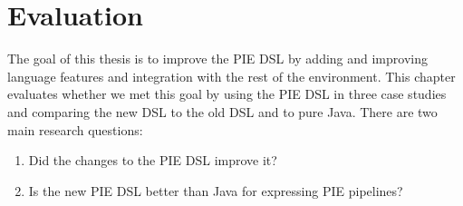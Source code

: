 \chapter{Evaluation}
\label{chap:evaluation}

The goal of this thesis is to improve the \ac{PIE} \ac{DSL} by adding and improving language features and integration with the rest of the environment.
This chapter evaluates whether we met this goal by using the \ac{PIE} \ac{DSL} in three case studies and comparing the new \ac{DSL} to the old \ac{DSL} and to pure Java.
There are two main research questions:
\begin{enumerate}
  \item Did the changes to the \ac{PIE} \ac{DSL} improve it?
  \item Is the new \ac{PIE} \ac{DSL} better than Java for expressing \ac{PIE} pipelines?
\end{enumerate}

